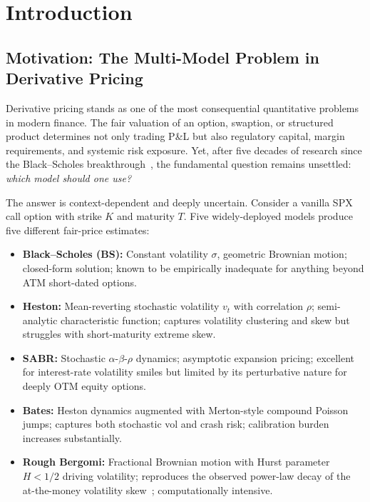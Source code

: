 \documentclass[11pt,a4paper]{article}
\theoremstyle{plain}
\theoremstyle{definition}
\theoremstyle{remark}
\begin{document}
\newpage

\section{Introduction}

\subsection{Motivation: The Multi-Model Problem in Derivative Pricing}

Derivative pricing stands as one of the most consequential quantitative problems in modern finance. The fair valuation of an option, swaption, or structured product determines not only trading P\&L but also regulatory capital, margin requirements, and systemic risk exposure. Yet, after five decades of research since the Black--Scholes breakthrough~\citep{black1973pricing}, the fundamental question remains unsettled: \emph{which model should one use?}

The answer is context-dependent and deeply uncertain. Consider a vanilla SPX call option with strike $K$ and maturity $T$. Five widely-deployed models produce five different fair-price estimates:

\begin{itemize}[nosep]
  \item \textbf{Black--Scholes (BS):} Constant volatility $\sigma$, geometric Brownian motion; closed-form solution; known to be empirically inadequate for anything beyond ATM short-dated options.
  \item \textbf{Heston:} Mean-reverting stochastic volatility $v_t$ with correlation $\rho$; semi-analytic characteristic function; captures volatility clustering and skew but struggles with short-maturity extreme skew.
  \item \textbf{SABR:} Stochastic $\alpha$-$\beta$-$\rho$ dynamics; asymptotic expansion pricing; excellent for interest-rate volatility smiles but limited by its perturbative nature for deeply OTM equity options.
  \item \textbf{Bates:} Heston dynamics augmented with Merton-style compound Poisson jumps; captures both stochastic vol and crash risk; calibration burden increases substantially.
  \item \textbf{Rough Bergomi:} Fractional Brownian motion with Hurst parameter $H < 1/2$ driving volatility; reproduces the observed power-law decay of the at-the-money volatility skew~\citep{gatheral2018volatility}; computationally intensive.
\end{itemize}
\end{document}
